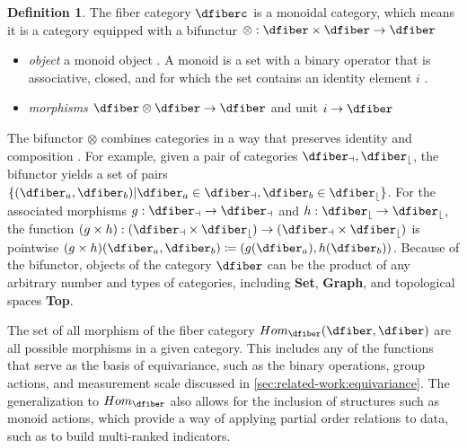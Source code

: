 \documentclass[10pt,journal,compsoc]{IEEEtran}
\theoremstyle{definition}
\newtheorem{definition}{Definition}[section]
\theoremstyle{remark}
\begin{document}
\begin{definition} 
  \label{def:category:F} The fiber category $\mathcal{\dfiberc}$ is a monoidal category\cite{milewskiCategoryTheoryProgrammers}, which means it is a category equipped with a bifunctur $\otimes: \mathcal{\dfiber} \times \mathcal{\dfiber} \rightarrow \mathcal{\dfiber}$
  \begin{itemize}
    \item \textit{object} a monoid object \dfiber. A monoid is a set with a binary operator that is associative, closed, and for which the set contains an identity element $i$ \cite{nlan:monoid}.
    \item \textit{morphisms} $\dfiber \otimes \dfiber \rightarrow \dfiber$ and unit $i \rightarrow \dfiber$
  \end{itemize}
\end{definition}
The bifunctor $\otimes$ combines categories in a way that  preserves identity and composition \cite{fongInvitationAppliedCategory2019}. For example, given a pair of categories $\mathcal{\dfiber_a},\mathcal{\dfiber_b}$, the bifunctor yields a set of pairs $\{(\dfiber_a, \dfiber_b) | \dfiber_a \in \mathcal{\dfiber_a}, \dfiber_b \in \mathcal{\dfiber_b}\}$. For the associated morphisms $g: \mathcal{\dfiber_a}\rightarrow \mathcal{\dfiber_a}$ and $h: \mathcal{\dfiber_b}\rightarrow \mathcal{\dfiber_b}$, the function $(g\times h): (\mathcal{\dfiber_a}\times \mathcal{\dfiber_b}) \rightarrow (\mathcal{\dfiber_a}\times \mathcal{\dfiber_b})$ is pointwise $(g\times h)(\dfiber_a, \dfiber_b)\coloneqq (g(\dfiber_a), h(\dfiber_b))$. Because of the bifunctor, objects of the category $\mathcal{\dfiber}$ can be the product of any arbitrary number and types of categories, including \textbf{Set}, \textbf{Graph}, and topological spaces \textbf{Top}.

The set of all morphism of the fiber category $Hom_{\mathcal{\dfiber}}(\dfiber, \dfiber)$ are all possible morphisms in a given category. This includes any of the functions that serve as the basis of equivariance, such as the binary operations, group actions, and measurement scale discussed in  \autoref{sec:related-work:equivariance}. The generalization to $Hom_\mathcal{\dfiber}$ also allows for the inclusion of structures such as monoid actions\cite{barrCategoryTheoryComputing}, which provide a way of applying partial order relations to data\cite{fongInvitationAppliedCategory2019}, such as to build multi-ranked indicators\cite{bruggemannRankingPrioritizationMultiindicator2011}.
\end{document}
